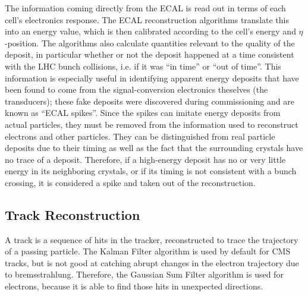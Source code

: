 The information coming directly from the ECAL 
is read out in terms of each cell's electronics response.  
The ECAL reconstruction algorithms translate this into 
an energy value, which is then calibrated 
according to the cell's energy %
and 
$\eta$-position.  
The algorithms also calculate quantities 
relevant to the quality of the deposit, 
in particular whether or not the deposit happened 
at a time consistent with the LHC 
bunch collisions, i.e. if it was ``in time'' or ``out of time''.  
This information is especially useful in 
identifying apparent energy deposits that have 
been found to come from the 
signal-conversion electronics theselves (the transducers); %
these fake deposits were discovered during 
commissioning and are known as ``ECAL spikes''.  
Since the spikes can imitate energy deposits from 
actual 
particles, %
they must be removed from the information used 
to reconstruct electrons and other particles.  
They can be distinguished from real particle deposits 
due to their timing 
as well as the fact that the surrounding crystals 
have no trace of a deposit.  
Therefore, if a high-energy deposit has no or 
very little energy in its neighboring crystals, 
or if its timing is not consistent with a bunch 
crossing, 
it is considered a spike and taken out of the 
reconstruction.  



\subsection{Track Reconstruction}
\label{evReco:track}
A track is a sequence of hits in the tracker, 
reconstructed to trace the trajectory of a passing 
particle.  
The Kalman Filter algorithm is used by default for CMS tracks, 
but is not good at catching abrupt changes in the 
electron trajectory due to bremsstrahlung.  
Therefore, the Gaussian Sum Filter algorithm 
is used for electrons, 
because it is able to find 
those hits in unexpected directions.  

